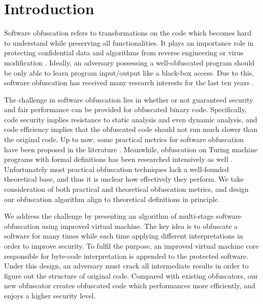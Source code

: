 \documentclass{../style/llncs}                   %
\begin{document}



\section{Introduction}

Software obfuscation refers to transformations on the code which
becomes hard to understand while preserving all functionalities.
It plays an importance role in protecting confidential data and algorithms
from reverse engineering or virus modification
\cite{collberg97,collberg02,madou06a,cappaert08}.
Ideally, an adversary possessing a well-obfuscated program
should be only able to learn program input/output like a black-box access.
Due to this, software obfuscation has received many research
interests for the last ten years
\cite{barak01,schwarz02,ogiso03,oorschot03,lynn04,madou06b,anckaert07,beaucamps07,collberg09}.


The challenge in software obfuscation lies in
whether or not guaranteed security and fair performance
can be provided for obfuscated binary code.
Specifically, code security implies resistance to
static analysis and even dynamic analysis, and code efficiency
implies that the obfuscated code should not run much slower
than the original code.
Up to now, some practical metrics for software obfuscation have been proposed
in the literature \cite{mit03,lynn04,madou06a,naeem07,anckaert07,ceccato09}.
Meanwhile, obfuscation on Turing machine programs with formal definitions
has been researched intensively as well
\cite{barak01,ogiso03,goldweisser05,wee05,canetti08,bitansky10,hohenberger10,canetti10}.
Unfortunately most practical obfuscation techniques
lack a well-founded theoretical base, and thus it is unclear
how effectively they perform.
We take consideration of both practical and theoretical obfuscation metrics,
and design our obfuscation algorithm align to theoretical definitions in principle.


We address the challenge by presenting an algorithm of multi-stage software obfuscation using
improved virtual machine.
The key idea is to obfuscate a software for many times while each time
applying different interpretations in order to improve security.
To fulfil the purpose, an improved virtual machine core
responsible for byte-code interpretation is appended to the protected software.
Under this design, an adversary must crack all intermediate results in order to figure out
the structure of original code.
Compared with existing obfuscators,
our new obfuscator creates obfuscated code which performances more efficiently,
and enjoys a higher security level.
\end{document}
